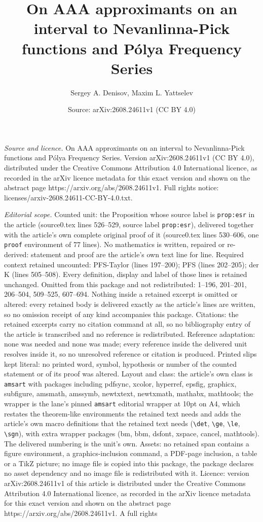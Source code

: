 \documentclass[10pt,a4paper]{amsart}
\title[On AAA approximants on an interval to Nevanlinna-Pick functi]{On AAA approximants on an interval to Nevanlinna-Pick functions and P\'olya Frequency Series}
\author{Sergey A. Denisov, Maxim L. Yattselev}
\date{Source: arXiv:2608.24611v1 (CC BY 4.0)}
\begin{document}
\maketitle

\noindent\emph{Source and licence.} On AAA approximants on an interval to Nevanlinna-Pick functions and P\'olya Frequency Series. Version arXiv:2608.24611v1 (CC BY 4.0), distributed under the Creative Commons Attribution 4.0 International licence, as recorded in the arXiv licence metadata for this exact version and shown on the abstract page https://arxiv.org/abs/2608.24611v1. Full rights notice: licenses/arxiv-2608.24611-CC-BY-4.0.txt.\par\smallskip

\noindent\textit{Editorial scope.} Counted unit: the Proposition whose source label is \texttt{prop:esr} in the article (source0.tex lines 526--529, source label \texttt{prop:esr}), delivered together with the article's own complete original proof of it (source0.tex lines 530--606, one \texttt{proof} environment of 77 lines). No mathematics is written, repaired or re-derived: statement and proof are the article's own text line for line. Required context retained uncounted: PFS-Taylor (lines 197--200); PFS (lines 202--205); der K (lines 505--508). Every definition, display and label of those lines is retained unchanged. Omitted from this package and not redistributed: 1--196, 201--201, 206--504, 509--525, 607--694. Nothing inside a retained excerpt is omitted or altered: every retained body is delivered exactly as the article's lines are written, so no omission receipt of any kind accompanies this package. Citations: the retained excerpts carry no citation command at all, so no bibliography entry of the article is transcribed and no reference is redistributed. Reference adaptation: none was needed and none was made; every reference inside the delivered unit resolves inside it, so no unresolved reference or citation is produced. Printed slips kept literal: no printed word, symbol, hypothesis or number of the counted statement or of its proof was altered. Layout and class: the article's own class is \texttt{amsart} with packages including pdfsync, xcolor, hyperref, epsfig, graphicx, subfigure, amsmath, amssymb, newtxtext, newtxmath, mathabx, mathtools; the wrapper is the lane's pinned \texttt{amsart} editorial wrapper at 10pt on A4, which restates the theorem-like environments the retained text needs and adds the article's own macro definitions that the retained text needs (\texttt{\textbackslash det}, \texttt{\textbackslash ge}, \texttt{\textbackslash le}, \texttt{\textbackslash sgn}), with extra wrapper packages (bm, bbm, dsfont, xspace, cancel, mathtools). The delivered numbering is the unit's own. Assets: no retained span contains a figure environment, a graphics-inclusion command, a PDF-page inclusion, a table or a TikZ picture; no image file is copied into this package, the package declares no asset dependency and no image file is redistributed with it. Licence: version arXiv:2608.24611v1 of this article is distributed under the Creative Commons Attribution 4.0 International licence, as recorded in the arXiv licence metadata for this exact version and shown on the abstract page https://arxiv.org/abs/2608.24611v1. A full rights 
\end{document}
